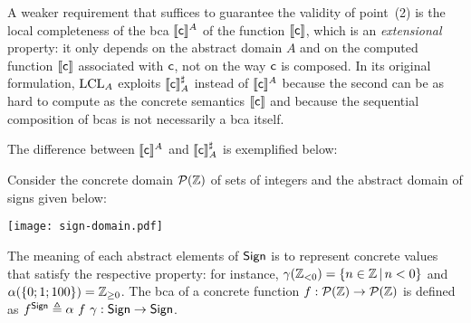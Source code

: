 A weaker requirement that suffices to guarantee the validity of point~(2) is the local completeness of the bca $\llbracket\mathsf{c}\rrbracket^{A}$ of the function $\llbracket\mathsf{c}\rrbracket$, which is an \emph{extensional} property: it only depends on the abstract domain $A$ and on the computed function $\llbracket\mathsf{c}\rrbracket$ associated with $\mathsf{c}$, not on the way $\mathsf{c}$ is composed. In its original formulation, $\text{LCL}_A$ exploits $\llbracket\mathsf{c}\rrbracket^{\sharp}_{A}$ instead of $\llbracket\mathsf{c}\rrbracket^{A}$ because the second can be as hard to compute as the concrete semantics $\llbracket\mathsf{c}\rrbracket$ and because the sequential composition of bcas is not necessarily a bca itself.

The difference between $\llbracket\mathsf{c}\rrbracket^{A}$ and $\llbracket\mathsf{c}\rrbracket^{\sharp}_{A}$ is exemplified below:
\begin{example}\label{ex:intro-ext-vs-int}
	Consider the concrete domain $\mathcal{P}(\mathbb{Z})$ of sets of integers and the abstract domain of signs given below:
	\begin{center}
%			
%			
		\texttt{[image: sign-domain.pdf]}
	\end{center}
	The meaning of each abstract elements of $\mathsf{Sign}$ is to represent concrete values that satisfy the respective property: for instance, $\gamma(\mathbb{Z}_{< 0}) = \{ n \in \mathbb{Z} \,\vert\, n < 0 \}$ and $\alpha( \{ 0; 1; 100 \}) = \mathbb{Z}_{\ge 0}$.
	The bca of a concrete function $f: \mathcal{P}(\mathbb{Z}) \to \mathcal{P}(\mathbb{Z})$ is defined as $f^{\mathsf{Sign}}\triangleq \alpha~f~\gamma: \mathsf{Sign} \to \mathsf{Sign}$.
	

\end{example}
